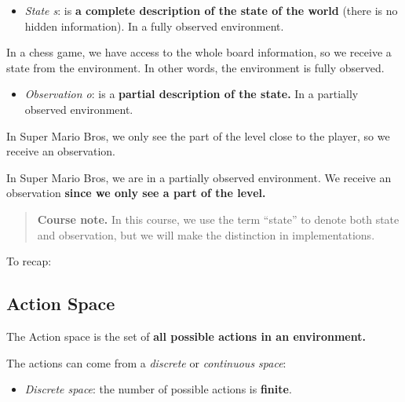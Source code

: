\documentclass[11pt,a4paper]{article}
\begin{document}
\begin{itemize}
\tightlist
\item
  \emph{State s}: is \textbf{a complete description of the state of the world} (there is no hidden information). In a fully observed environment.
\end{itemize}


In a chess game, we have access to the whole board information, so we receive a state from the environment. In other words, the environment is fully observed.

\begin{itemize}
\tightlist
\item
  \emph{Observation o}: is a \textbf{partial description of the state.} In a partially observed environment.
\end{itemize}


In Super Mario Bros, we only see the part of the level close to the player, so we receive an observation.

In Super Mario Bros, we are in a partially observed environment. We receive an observation \textbf{since we only see a part of the level.}

\begin{quote}
\textbf{Course note.} In this course, we use the term ``state'' to denote both state and observation, but we will make the distinction in implementations.
\end{quote}

To recap:


\subsection{Action Space}\label{action-space}

The Action space is the set of \textbf{all possible actions in an environment.}

The actions can come from a \emph{discrete} or \emph{continuous space}:

\begin{itemize}
\tightlist
\item
  \emph{Discrete space}: the number of possible actions is \textbf{finite}.
\end{itemize}
\end{document}
